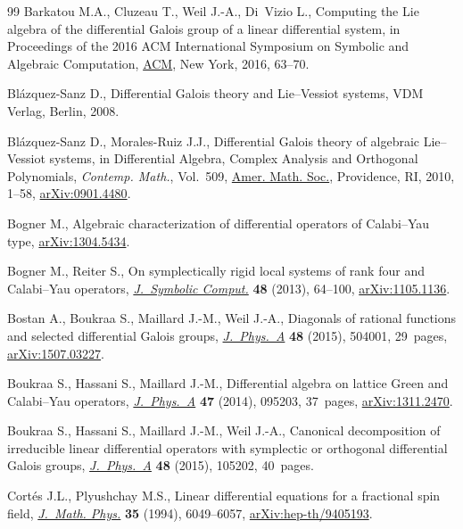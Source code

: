 \begin{thebibliography}{99}
Barkatou M.A., Cluzeau T., Weil J.-A., Di~Vizio L., Computing the {L}ie algebra
 of the differential {G}alois group of a linear differential system, in
 Proceedings of the 2016 {ACM} {I}nternational {S}ymposium on {S}ymbolic and
 {A}lgebraic {C}omputation, \href{https://doi.org/10.1145/2930889.2930932}{ACM}, New York, 2016, 63--70.

Bl\'azquez-Sanz D., Differential {G}alois theory and {L}ie--{V}essiot systems,
 {VDM} Verlag, Berlin, 2008.

Bl\'azquez-Sanz D., Morales-Ruiz J.J., Differential {G}alois theory of
 algebraic {L}ie--{V}essiot systems, in Differential Algebra, Complex Analysis
 and Orthogonal Polynomials, \textit{Contemp. Math.}, Vol.~509, \href{https://doi.org/10.1090/conm/509/09973}{Amer. Math.
 Soc.}, Providence, RI, 2010, 1--58, \href{https://arxiv.org/abs/0901.4480}{arXiv:0901.4480}.

Bogner M., Algebraic characterization of differential operators of
 {C}alabi--{Y}au type, \href{https://arxiv.org/abs/1304.5434}{arXiv:1304.5434}.

Bogner M., Reiter S., On symplectically rigid local systems of rank four and
 {C}alabi--{Y}au operators, \href{https://doi.org/10.1016/j.jsc.2011.11.007}{\textit{J.~Symbolic Comput.}} \textbf{48} (2013),
 64--100, \href{https://arxiv.org/abs/1105.1136}{arXiv:1105.1136}.

Bostan A., Boukraa S., Maillard J.-M., Weil J.-A., Diagonals of rational
 functions and selected differential {G}alois groups, \href{https://doi.org/10.1088/1751-8113/48/50/504001}{\textit{J.~Phys.~A}}
 \textbf{48} (2015), 504001, 29~pages, \href{https://arxiv.org/abs/1507.03227}{arXiv:1507.03227}.

Boukraa S., Hassani S., Maillard J.-M., Differential algebra on lattice {G}reen
 and {C}alabi--{Y}au operators, \href{https://doi.org/10.1088/1751-8113/47/9/095203}{\textit{J.~Phys.~A}} \textbf{47} (2014),
 095203, 37~pages, \href{https://arxiv.org/abs/1311.2470}{arXiv:1311.2470}.

Boukraa S., Hassani S., Maillard J.-M., Weil J.-A., Canonical decomposition of
 irreducible linear differential operators with symplectic or orthogonal
 differential {G}alois groups, \href{https://doi.org/10.1088/1751-8113/48/10/105202}{\textit{J.~Phys.~A}} \textbf{48} (2015), 105202,
 40~pages.

Cort\'es J.L., Plyushchay M.S., Linear differential equations for a fractional
 spin field, \href{https://doi.org/10.1063/1.530727}{\textit{J.~Math. Phys.}} \textbf{35} (1994), 6049--6057,
 \href{https://arxiv.org/abs/hep-th/9405193}{arXiv:hep-th/9405193}.


\end{thebibliography}
